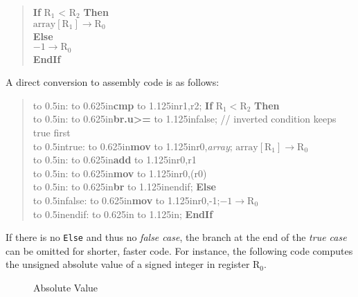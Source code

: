 \documentclass[12pt,english]{book}
\newcommand*{\asmstyle}{\noindent\ttfamily\selectfont\small}
\newcommand*{\asmline}[3][]{%
\null\hbox to 0.5in{\ifx#1\empty\else{#1}:\fi\hss}%
\hbox to 0.625in{\textbf{#2}\hss}%
\hbox to 1.125in{#3\hss}}
\begin{document}
\begin{quote}\asmstyle
\null\textbf{If} \(\text{R}_1\) < \(\text{R}_2\) \textbf{Then}\\
\null\qquad \(\text{array}[\text{R}_1]\rightarrow\text{R}_0\)\\
\null\textbf{Else}\\
\null\qquad \(-1\rightarrow \text{R}_0\)\\
\null\textbf{EndIf}
\end{quote}
A direct conversion to assembly code is as follows:
\begin{quote}\asmstyle
  \asmline{cmp}{r1,r2};
  \textbf{If} \(\text{R}_1 < \text{R}_2\) \textbf{Then}\\
  \asmline{br.u>=}{false};\qquad
  // inverted condition keeps true first\\
  \asmline[true]{mov}{r0,\textit{array}};\qquad
  \(\text{array}[\text{R}_1]\rightarrow\text{R}_0\)\\
  \asmline{add}{r0,r1}\\
  \asmline{mov}{r0,(r0)}\\
  \asmline{br}{endif}; \textbf{Else}\\
  \asmline[false]{mov}{r0,-1};\qquad\(-1\rightarrow\text{R}_0\)\\
  \asmline[endif]{}{}; \textbf{EndIf}
\end{quote}

If there is no \texttt{Else} and thus no \textit{false case},
the branch at the end of the \textit{true case} can be omitted
for shorter, faster code.
For instance, the following code computes the unsigned absolute value
of a signed integer in register \(\text{R}_0\).

\begin{figure}[ht!]\centering
  \caption{Absolute Value}
  \label{fig:if-no-else}
\end{figure}
\end{document}
